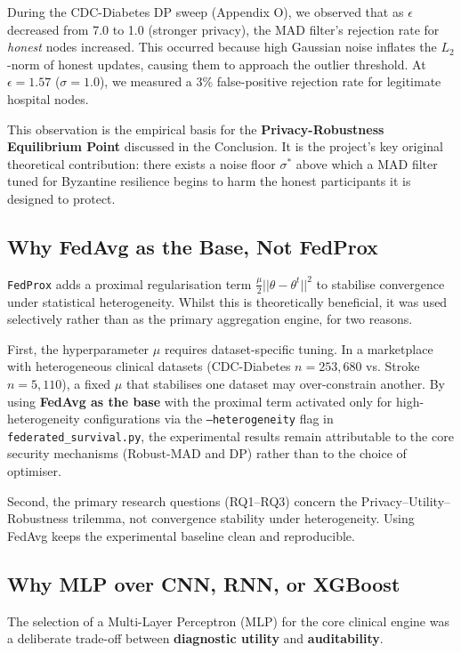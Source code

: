 \documentclass[10pt, a4paper, twocolumn]{article}
\begin{document}
During the CDC-Diabetes DP sweep (Appendix O), we observed that as $\epsilon$ decreased from 7.0 to 1.0 (stronger privacy), the MAD filter's rejection rate for \textit{honest} nodes increased. This occurred because high Gaussian noise inflates the $L_2$-norm of honest updates, causing them to approach the outlier threshold. At $\epsilon = 1.57$ ($\sigma = 1.0$), we measured a 3\% false-positive rejection rate for legitimate hospital nodes.

This observation is the empirical basis for the \textbf{Privacy-Robustness Equilibrium Point} discussed in the Conclusion. It is the project's key original theoretical contribution: there exists a noise floor $\sigma^*$ above which a MAD filter tuned for Byzantine resilience begins to harm the honest participants it is designed to protect.

\subsection{Why FedAvg as the Base, Not FedProx}
\texttt{FedProx} \cite{li2020} adds a proximal regularisation term $\frac{\mu}{2}||\theta - \theta^t||^2$ to stabilise convergence under statistical heterogeneity. Whilst this is theoretically beneficial, it was used selectively rather than as the primary aggregation engine, for two reasons.

First, the hyperparameter $\mu$ requires dataset-specific tuning. In a marketplace with heterogeneous clinical datasets (CDC-Diabetes $n=253,680$ vs. Stroke $n=5,110$), a fixed $\mu$ that stabilises one dataset may over-constrain another. By using \textbf{FedAvg as the base} with the proximal term activated only for high-heterogeneity configurations via the \texttt{--heterogeneity} flag in \texttt{federated\_survival.py}, the experimental results remain attributable to the core security mechanisms (Robust-MAD and DP) rather than to the choice of optimiser.

Second, the primary research questions (RQ1--RQ3) concern the Privacy--Utility--Robustness trilemma, not convergence stability under heterogeneity. Using FedAvg keeps the experimental baseline clean and reproducible.

\subsection{Why MLP over CNN, RNN, or XGBoost}
The selection of a Multi-Layer Perceptron (MLP) for the core clinical engine was a deliberate trade-off between \textbf{diagnostic utility} and \textbf{auditability}. 
\end{document}
